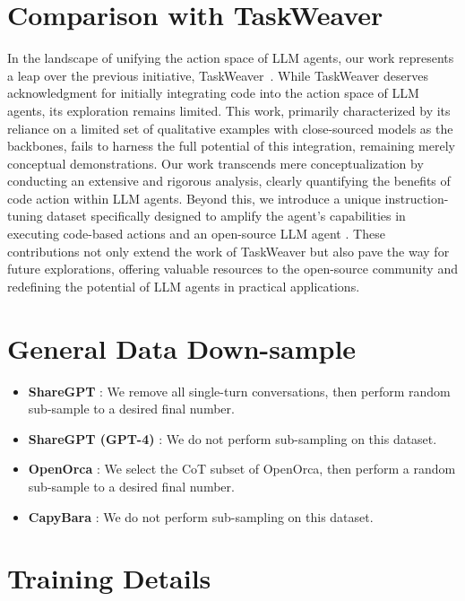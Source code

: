 \section{Comparison with TaskWeaver}
\label{sec:taskweaver}
In the landscape of unifying the action space of LLM agents, our work represents a leap over the previous initiative, TaskWeaver~\citep{qiao2023taskweaver}. 
% 
While TaskWeaver deserves acknowledgment for initially integrating code into the action space of LLM agents, its exploration remains limited.
% 
This work, primarily characterized by its reliance on a limited set of qualitative examples with close-sourced models as the backbones, fails to harness the full potential of this integration, remaining merely conceptual demonstrations.
% 
Our work transcends mere conceptualization by conducting an extensive and rigorous analysis, clearly quantifying the benefits of code action within LLM agents.
% 
% 
Beyond this, we introduce a unique instruction-tuning dataset \dataname specifically designed to amplify the agent's capabilities in executing code-based actions and an open-source LLM agent \modelname.
% 
These contributions not only extend the work of TaskWeaver but also pave the way for future explorations, offering valuable resources to the open-source community and redefining the potential of LLM agents in practical applications.


\section{General Data Down-sample}
\label{sec:general_data_downsample}

\begin{itemize}
    \item \textbf{ShareGPT} \citep{sharegpt_dataset}: We remove all single-turn conversations, then perform random sub-sample to a desired final number.
    \item \textbf{ShareGPT (GPT-4)} \citep{sharegpt4_dataset}: We do not perform sub-sampling on this dataset.
    \item \textbf{OpenOrca} \citep{OpenOrca}: We select the CoT subset of OpenOrca, then perform a random sub-sample to a desired final number.
    \item \textbf{CapyBara} \citep{capybara_dataset}: We do not perform sub-sampling on this dataset.
\end{itemize}


\section{\modelname Training Details}
\label{sec:model_training_details}

